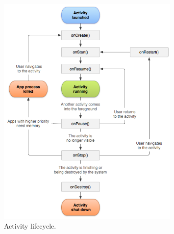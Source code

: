 \begin{figure}[H]
\centering
\includegraphics[width=0.8\textwidth]{Figures/activity_lifecycle.png}
\caption{Activity lifecycle.}
\label{android-activity}
\end{figure}

